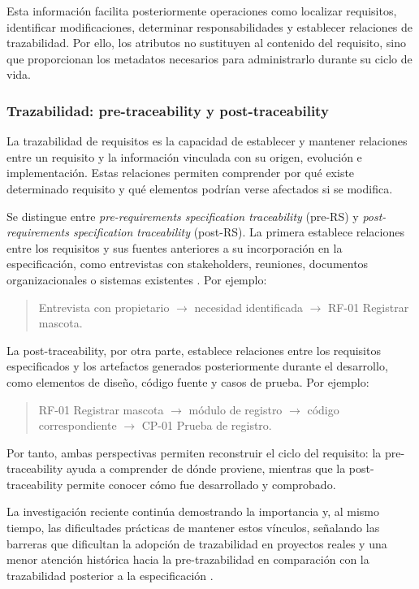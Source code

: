 \documentclass[journal,onecolumn]{IEEEtran}
\begin{document}
	Esta información facilita posteriormente operaciones como localizar requisitos, identificar modificaciones, determinar responsabilidades y establecer relaciones de trazabilidad. Por ello, los atributos no sustituyen al contenido del requisito, sino que proporcionan los metadatos necesarios para administrarlo durante su ciclo de vida.
	
	\subsubsection{Trazabilidad: pre-traceability y post-traceability}
	
	La trazabilidad de requisitos es la capacidad de establecer y mantener relaciones entre un requisito y la información vinculada con su origen, evolución e implementación. Estas relaciones permiten comprender por qué existe determinado requisito y qué elementos podrían verse afectados si se modifica.
	
	Se distingue entre \textit{pre-requirements specification traceability} (pre-RS) y \textit{post-requirements specification traceability} (post-RS). La primera establece relaciones entre los requisitos y sus fuentes anteriores a su incorporación en la especificación, como entrevistas con stakeholders, reuniones, documentos organizacionales o sistemas existentes \cite{Mucha2024}. Por ejemplo:
	
	\begin{quote}
		Entrevista con propietario $\rightarrow$ necesidad identificada $\rightarrow$ RF-01 Registrar mascota.
	\end{quote}
	
	La post-traceability, por otra parte, establece relaciones entre los requisitos especificados y los artefactos generados posteriormente durante el desarrollo, como elementos de diseño, código fuente y casos de prueba. Por ejemplo:
	
	\begin{quote}
		RF-01 Registrar mascota $\rightarrow$ módulo de registro $\rightarrow$ código correspondiente $\rightarrow$ CP-01 Prueba de registro.
	\end{quote}
	
	Por tanto, ambas perspectivas permiten reconstruir el ciclo del requisito: la pre-traceability ayuda a comprender de dónde proviene, mientras que la post-traceability permite conocer cómo fue desarrollado y comprobado.
	
	La investigación reciente continúa demostrando la importancia y, al mismo tiempo, las dificultades prácticas de mantener estos vínculos, señalando las barreras que dificultan la adopción de trazabilidad en proyectos reales y una menor atención histórica hacia la pre-trazabilidad en comparación con la trazabilidad posterior a la especificación \cite{Mucha2024, Ruiz2023}.
	
\end{document}
